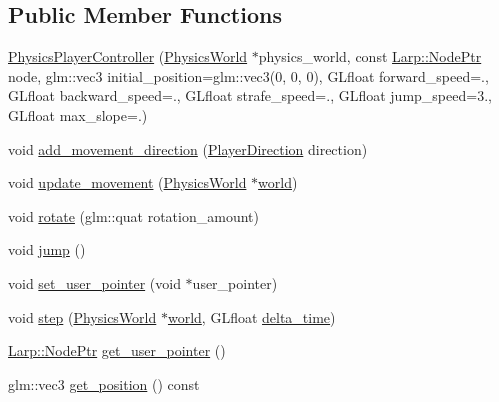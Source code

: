 \subsection*{Public Member Functions}
\begin{DoxyCompactItemize}
\item 
\hyperlink{classPhysicsPlayerController_a5e35a8bbba953a855c0ffa605ed58f07}{Physics\+Player\+Controller} (\hyperlink{classPhysicsWorld}{Physics\+World} $\ast$physics\+\_\+world, const \hyperlink{namespaceLarp_a171c1dc8b70cfb441b15d7386780db23}{Larp\+::\+Node\+Ptr} node, glm\+::vec3 initial\+\_\+position=glm\+::vec3(0, 0, 0), G\+Lfloat forward\+\_\+speed=., G\+Lfloat backward\+\_\+speed=., G\+Lfloat strafe\+\_\+speed=., G\+Lfloat jump\+\_\+speed=3., G\+Lfloat max\+\_\+slope=.)
\item 
void \hyperlink{classPhysicsPlayerController_a9980ea5d6d8b96826d8a86ff7a9e8716}{add\+\_\+movement\+\_\+direction} (\hyperlink{classPhysicsPlayerController_a947993cc77a553b6a30c9ea95c81de5e}{Player\+Direction} direction)
\item 
void \hyperlink{classPhysicsPlayerController_a611f5a0cdc5b9f74376880c47dc997a4}{update\+\_\+movement} (\hyperlink{classPhysicsWorld}{Physics\+World} $\ast$\hyperlink{test_8cpp_a80518da77f9ca26660dd6e4584b92be4}{world})
\item 
void \hyperlink{classPhysicsPlayerController_a540179190225822c918851855f3fadbf}{rotate} (glm\+::quat rotation\+\_\+amount)
\item 
void \hyperlink{classPhysicsPlayerController_a392fedfa034d9fbd261fd6d4d348b2ce}{jump} ()
\item 
void \hyperlink{classPhysicsPlayerController_a976d927f76cb9fd366c303660d24c585}{set\+\_\+user\+\_\+pointer} (void $\ast$user\+\_\+pointer)
\item 
void \hyperlink{classPhysicsPlayerController_a1e32faab6f2e50c13c9a9e64e3163079}{step} (\hyperlink{classPhysicsWorld}{Physics\+World} $\ast$\hyperlink{test_8cpp_a80518da77f9ca26660dd6e4584b92be4}{world}, G\+Lfloat \hyperlink{test_8cpp_a45742981446f2bedcf5573ca6b329564}{delta\+\_\+time})
\item 
\hyperlink{namespaceLarp_a171c1dc8b70cfb441b15d7386780db23}{Larp\+::\+Node\+Ptr} \hyperlink{classPhysicsPlayerController_aa7f40ea9fc5b1ef645972e0f2b0042ed}{get\+\_\+user\+\_\+pointer} ()
\item 
glm\+::vec3 \hyperlink{classPhysicsPlayerController_a18889e54457b7f91196d9302fd524775}{get\+\_\+position} () const 
\item 

\end{DoxyCompactItemize}
